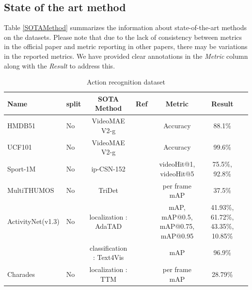 \documentclass[a4paper]{article}
\begin{document}
\subsection{State of the art method}

Table \ref{SOTAMethod} summarizes the information about state-of-the-art methods on the datasets. Please note that due to the lack of consistency between metrics in the official paper and metric reporting in other papers, there may be variations in the reported metrics. We have provided clear annotations in the \textit{Metric} column along with the \textit{Result} to address this.

\begin{table}
	\centering
	\smaller[0.5]
	\caption{Action recognition dataset}
	\renewcommand{\arraystretch}{1.5}
	\begin{tabular}{l|l|c c c c c}
		\toprule
		Name                    & split         & SOTA Method                   & Ref                  & Metric                                         & Result                                               \\
		\hline
		HMDB51                  & No            & VideoMAE V2-g                 & \cite{VideoMAEV2g}   & Accuracy                                       & 88.1\%                                             \\
		UCF101                  & No            & VideoMAE V2-g                 & \cite{VideoMAEV2g}   & Accuracy                                       & 99.6\%                                              \\
		Sport-1M                & No            & ip-CSN-152                    & \cite{ip-CSN-152}    & videoHit@1, videoHit@5                         & 75.5\%, 92.8\%                              \\
		MultiTHUMOS             & No            & TriDet                        & \cite{TriDet}        & per frame mAP                                  & 37.5\%                                               \\
		ActivityNet(v1.3)       & No            & localization : AdaTAD         & \cite{AdaTAD}        & mAP, mAP@0.5, mAP@0.75, mAP@0.95               & 41.93\%, 61.72\%, 43.35\%, 10.85\%                      \\ 
		                        &               & classification : Text4Vis     & \cite{Text4Vis}      & mAP                                            & 96.9\%  \\
		Charades                & No            & localization : TTM            & \cite{TTM}           & per frame mAP                                  & 28.79\%                                              \\

\end{tabular}
\end{table}
\end{document}
